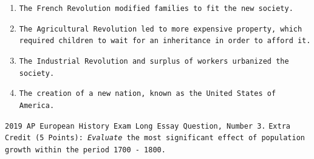 \documentclass[11pt]{scrartcl} %
\begin{document}
\begin{enumerate}[label=\texttt{\textbf{\alph*)}}]
\item \texttt{The French Revolution modified families to fit the new society.}
\item \texttt{The Agricultural Revolution led to more expensive property, which required children to wait for an inheritance in order to afford it.}
\item \texttt{The Industrial Revolution and surplus of workers urbanized the society.}
\item \texttt{The creation of a new nation, known as the United States of America.}
\end{enumerate}

\begin{center} 
\texttt{2019 AP European History Exam Long Essay Question, Number 3.}
\newline
\texttt{Extra Credit (5 Points): \textit{Evaluate} the most significant effect of population growth within the period 1700 - 1800.}
\end{center}

\end{document}
